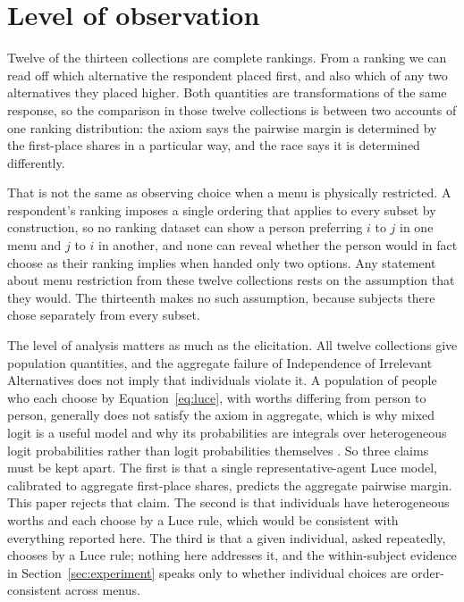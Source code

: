 \documentclass[11pt]{article}
\begin{document}
\section{Level of observation}
\label{sec:estimand}

Twelve of the thirteen collections are complete rankings. From a ranking we can read off
which alternative the respondent placed first, and also which of any two
alternatives they placed higher. Both quantities are transformations of the same
response, so the comparison in those twelve collections is between two accounts of one
ranking distribution: the axiom says the pairwise margin is determined by the
first-place shares in a particular way, and the race says it is determined
differently.

That is not the same as observing choice when a menu is physically restricted. A
respondent's ranking imposes a single ordering that applies to every subset by
construction, so no ranking dataset can show a person preferring $i$ to $j$ in one
menu and $j$ to $i$ in another, and none can reveal whether the person would in
fact choose as their ranking implies when handed only two options. Any statement
about menu restriction from these twelve collections rests on the assumption that they
would. The thirteenth makes no such assumption, because subjects there chose
separately from every subset.

The level of analysis matters as much as the elicitation. All twelve collections give
population quantities, and the aggregate failure of Independence of Irrelevant
Alternatives does not imply that individuals violate it. A population of people who
each choose by Equation~\eqref{eq:luce}, with worths differing from person to
person, generally does not satisfy the axiom in aggregate, which is why mixed logit
is a useful model and why its probabilities are integrals over heterogeneous logit
probabilities rather than logit probabilities themselves \cite{mcfaddentrain2000}.
So three claims must be kept apart. The first is that a single representative-agent
Luce model, calibrated to aggregate first-place shares, predicts the aggregate
pairwise margin. This paper rejects that claim. The second is that individuals have
heterogeneous worths and each choose by a Luce rule, which would be consistent with
everything reported here. The third is that a given individual, asked repeatedly,
chooses by a Luce rule; nothing here addresses it, and the within-subject evidence
in Section~\ref{sec:experiment} speaks only to whether individual choices are
order-consistent across menus.
\end{document}
